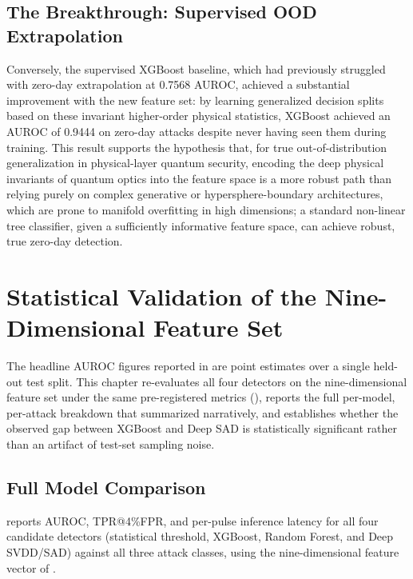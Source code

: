 \documentclass[12pt, a4paper]{report}
\begin{document}
\section{The Breakthrough: Supervised OOD Extrapolation}
Conversely, the supervised XGBoost baseline, which had previously struggled with zero-day extrapolation at 0.7568 AUROC, achieved a substantial improvement with the new feature set: by learning generalized decision splits based on these invariant higher-order physical statistics, XGBoost achieved an AUROC of 0.9444 on zero-day attacks despite never having seen them during training. This result supports the hypothesis that, for true out-of-distribution generalization in physical-layer quantum security, encoding the deep physical invariants of quantum optics into the feature space is a more robust path than relying purely on complex generative or hypersphere-boundary architectures, which are prone to manifold overfitting in high dimensions; a standard non-linear tree classifier, given a sufficiently informative feature space, can achieve robust, true zero-day detection.

\chapter{Statistical Validation of the Nine-Dimensional Feature Set}\label{ch:statval}

The headline AUROC figures reported in  are point estimates over a single held-out test split. This chapter re-evaluates all four detectors on the nine-dimensional feature set under the same pre-registered metrics (), reports the full per-model, per-attack breakdown that  summarized narratively, and establishes whether the observed gap between XGBoost and Deep SAD is statistically significant rather than an artifact of test-set sampling noise.

\section{Full Model Comparison}\label{sec:statval_full}
 reports AUROC, TPR@4\%FPR, and per-pulse inference latency for all four candidate detectors (statistical threshold, XGBoost, Random Forest, and Deep SVDD/SAD) against all three attack classes, using the nine-dimensional feature vector of .
\end{document}
